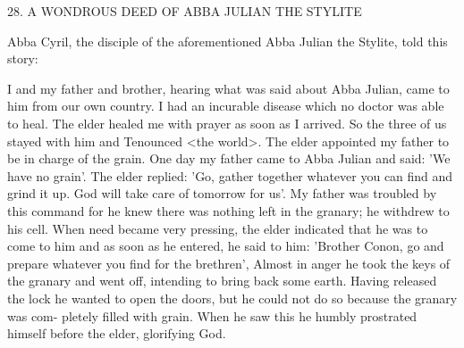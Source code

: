 28. A WONDROUS DEED OF
ABBA JULIAN THE STYLITE

Abba Cyril, the disciple of the aforementioned Abba Julian the
Stylite, told this story:

I and my father and brother, hearing what was said about Abba
Julian, came to him from our own country. I had an incurable
disease which no doctor was able to heal. The elder healed me with
prayer as soon as I arrived. So the three of us stayed with him and
Tenounced <the world>. The elder appointed my father to be in
charge of the grain. One day my father came to Abba Julian and
said: 'We have no grain'. The elder replied: 'Go, gather together
whatever you can find and grind it up. God will take care of
tomorrow for us'. My father was troubled by this command for he
knew there was nothing left in the granary; he withdrew to his cell.
When need became very pressing, the elder indicated that he was to
come to him and as soon as he entered, he said to him: 'Brother
Conon, go and prepare whatever you find for the brethren', Almost
in anger he took the keys of the granary and went off, intending to
bring back some earth. Having released the lock he wanted to open
the doors, but he could not do so because the granary was com-
pletely filled with grain. When he saw this he humbly prostrated
himself before the elder, glorifying God.

